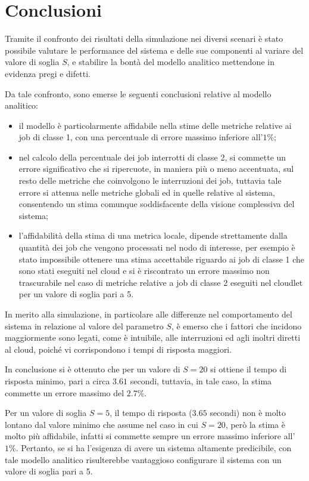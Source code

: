 \section{Conclusioni}
Tramite il confronto dei risultati della simulazione nei diversi scenari è stato
possibile valutare le performance del sistema e delle sue componenti al variare
del valore di soglia $S$, e stabilire la bontà del modello analitico mettendone
in evidenza pregi e difetti.

Da tale confronto, sono emerse le seguenti conclusioni relative al modello
analitico:
\begin{itemize}
\item il modello è particolarmente affidabile nella stime delle metriche
relative ai job di classe 1, con una percentuale di errore massimo inferiore
all'$1\%$;
\item nel calcolo della percentuale dei job interrotti di classe 2, si commette
un errore significativo che si ripercuote, in maniera più o meno accentuata, sul
resto delle metriche che coinvolgono le interruzioni dei job, tuttavia tale
errore si attenua nelle metriche globali ed in quelle relative al sistema,
consentendo un stima comunque soddisfacente della visione complessiva del
sistema;
\item l'affidabilità della stima di una metrica locale, dipende strettamente
dalla quantità dei job che vengono processati nel nodo di interesse, per esempio
è stato impossibile ottenere una stima accettabile riguardo ai job di classe 1
che sono stati eseguiti nel cloud e si è riscontrato un errore massimo non
trascurabile nel caso di metriche relative a job di classe 2 eseguiti nel
cloudlet per un valore di soglia pari a 5.
\end{itemize}

In merito alla simulazione, in particolare alle differenze nel comportamento del
sistema in relazione al valore del parametro $S$, è emerso che i fattori che
incidono maggiormente sono legati, come è intuibile, alle interruzioni ed agli
inoltri diretti al cloud, poiché vi corrispondono i tempi di risposta maggiori.

In conclusione si è ottenuto che per un valore di $S=20$ si ottiene il
tempo di risposta minimo, pari a circa $3.61$ secondi, tuttavia, in tale caso,
la stima commette un errore massimo del $2.7\%$. 

Per un valore di soglia $S=5$, il tempo di risposta ($3.65$ secondi) non è molto
lontano dal valore minimo che assume nel caso in cui $S=20$, però la stima è
molto più affidabile, infatti si commette sempre un errore massimo inferiore
all'$1\%$.  Pertanto, se si ha l'esigenza di avere un sistema altamente
predicibile, con tale modello analitico risulterebbe vantaggioso configurare il
sistema con un valore di soglia pari a 5.

